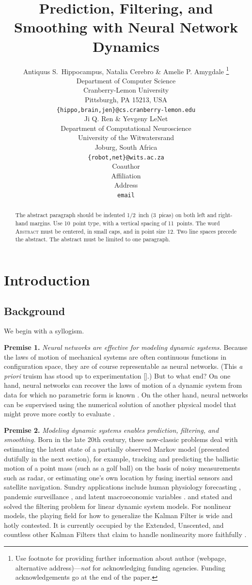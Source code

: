 \documentclass{article} %
\title{Prediction, Filtering, and Smoothing with Neural Network Dynamics}
\author{Antiquus S.~Hippocampus, Natalia Cerebro \& Amelie P. Amygdale \thanks{ Use footnote for providing further information
about author (webpage, alternative address)---\emph{not} for acknowledging
funding agencies.  Funding acknowledgements go at the end of the paper.} \\
Department of Computer Science\\    
Cranberry-Lemon University\\
Pittsburgh, PA 15213, USA \\
\texttt{\{hippo,brain,jen\}@cs.cranberry-lemon.edu} \\
\And
Ji Q. Ren \& Yevgeny LeNet \\
Department of Computational Neuroscience \\
University of the Witwatersrand \\
Joburg, South Africa \\
\texttt{\{robot,net\}@wits.ac.za} \\
\AND
Coauthor \\
Affiliation \\
Address \\
\texttt{email}
}
\begin{document}
\maketitle

\begin{abstract}
The abstract paragraph should be indented 1/2~inch (3~picas) on both left and
right-hand margins. Use 10~point type, with a vertical spacing of 11~points.
The word \textsc{Abstract} must be centered, in small caps, and in point size 12. Two
line spaces precede the abstract. The abstract must be limited to one
paragraph.
\end{abstract}

\section{Introduction}
\subsection{Background}
We begin with a syllogism.

\textbf{Premise 1.} \emph{Neural networks are effective for modeling dynamic systems.}
Because the laws of motion of mechanical systems are often continuous functions in configuration space, they are of course representable as neural networks.
(This \emph{a priori} truism has stood up to experimentation 
[\citealt{narendra_neural_1992,masri_identification_1993}].)
But to what end?
On one hand, neural networks can recover the laws of motion of a dynamic system from data for which no parametric form is known \citep{pillonetto_deep_2025}.
On the other hand, neural networks can be supervised using the numerical solution of another physical model that might prove more costly to evaluate \citep{mohajerin_multistep_2019,michalowska_neural_2024}.

\textbf{Premise 2.} \emph{Modeling dynamic systems enables prediction, filtering, and smoothing.}
Born in the late 20th century, these now-classic problems deal with estimating the latent state of a partially observed Markov model (presented dutifully in the next section),
for example, tracking and predicting the ballistic motion of a point mass (such as a golf ball) on the basis of noisy measurements such as radar,
 or estimating one's own location by fusing 
inertial sensors and satellite navigation.
Sundry applications include human physiology forecasting \cite{albers_interpretable_2023}, pandemic surveillance \cite{alsaggaf_nonlinear_2024}, and latent macroeconomic variables \cite{burmeister_kalman_1982}.
\citet{kalman_new_1961} and \citet{luenberger_observing_1964} stated and solved the filtering problem for linear dynamic system models.
For nonlinear models, the playing field for how to generalize the Kalman Filter is wide and hotly contested.
It is currently occupied by the Extended, Unscented, and countless other Kalman Filters that claim to handle nonlinearity more faithfully \citep{sarkka_bayesian_2023,jiang_new_2025}.
\end{document}

